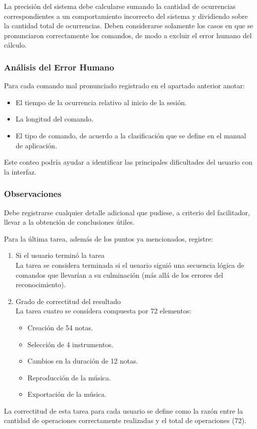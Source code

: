 La precisi\'on del sistema debe calcularse sumando la cantidad de ocurrencias correspondientes a un 
comportamiento incorrecto del sistema y dividiendo sobre la cantidad total de ocurrencias.
Deben considerarse solamente los casos en que se pronunciaron correctamente los comandos, de modo a 
excluir el error humano del c\'alculo.


\subsubsection{An\'alisis del Error Humano}
Para cada comando mal pronunciado registrado en el apartado anterior anotar:
\begin{itemize}
    \item El tiempo de la ocurrencia relativo al inicio de la sesi\'on.
    \item La longitud del comando.
    \item El tipo de comando, de acuerdo a la clasificaci\'on que se define en el manual de aplicaci\'on.
\end{itemize}

Este conteo podr\'ia ayudar a identificar las principales dificultades del usuario con la interfaz.

\subsubsection{Observaciones}

Debe registrarse cualquier detalle adicional que pudiese, a criterio del facilitador, llevar a la 
obtenci\'on de conclusiones \'utiles.

Para la \'ultima tarea, adem\'as de los puntos ya mencionados, registre:
\begin{enumerate}
    \item Si el usuario termin\'o la tarea \\
    La tarea se considera terminada si el usuario sigui\'o una secuencia l\'ogica de comandos que 
    llevar\'ian a su culminaci\'on (m\'as all\'a de los errores del reconocimiento).
    \item Grado de correctitud del resultado \\
    La tarea cuatro se considera compuesta por 72 elementos:
    \begin{itemize}
        \item Creaci\'on de 54 notas.
        \item Selecci\'on de 4 instrumentos.
        \item Cambios en la duraci\'on de 12 notas.
        \item Reproducci\'on de la m\'usica.
        \item Exportaci\'on de la m\'usica.
    \end{itemize}

\end{enumerate}

La correctitud de esta tarea para cada usuario se define como la raz\'on entre la cantidad de 
operaciones correctamente realizadas y el total de operaciones (72).

